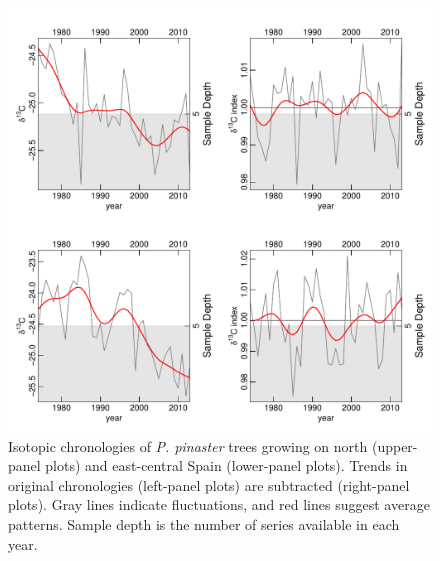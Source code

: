 \documentclass[review,authoryear]{elsarticle}
\begin{document}
\clearpage
\begin{figure}\centering
\includegraphics[scale=0.7,trim=20mm 0mm 20mm 0mm]{ideltas} 
\caption{Isotopic chronologies of \textit{P. pinaster} trees growing
  on north (upper-panel plots) and east-central Spain (lower-panel
  plots). Trends in original chronologies (left-panel plots) are
  subtracted (right-panel plots). Gray lines indicate fluctuations,
  and red lines suggest average patterns. Sample depth is the number
  of series available in each year.}
\label{fig:LWSC} 
\end{figure}
\end{document}
